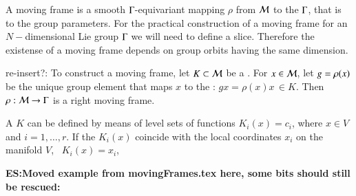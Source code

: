 A moving frame is a smooth
$\Gamma$-equivariant mapping $\rho$ from $\mathcal{M}$ to the
$\Gamma$, that is to the group parameters.  For the practical
construction of a moving frame for an $N-$dimensional Lie group
$\Gamma$ we will need to define a slice.
Therefore the existense of a moving frame depends on
group orbits having the same dimension.

re-insert?: To construct a moving frame, let $K\subset\mathcal{M}$ be a {\slice}. For $x\in \mathcal{M}$, let
$g=\rho(x)$ be the unique group element that maps $x$
to the {\slice}: $g x = \rho(x) x\, \in K$. Then
$\rho:\mathcal{M}\rightarrow \Gamma$ is a right moving frame.

A {\slice} $K$ can be defined by means of level sets of
functions $K_i(x)=c_i$, where $x\in V$ and $i=1,\ldots,r$. If
the $K_i(x)$ coincide with the local coordinates $x_i$ on the
manifold $V$, \ie~$K_i(x)=x_i$,

{\bf ES:Moved example from movingFrames.tex here, some bits should still be rescued:}

